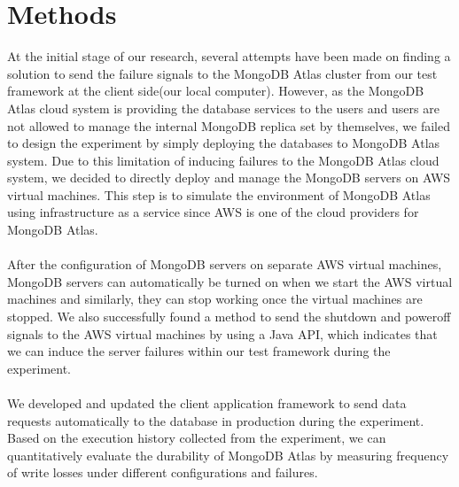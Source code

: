 \documentclass[12pt]{article}
\begin{document}
\section{Methods}
At the initial stage of our research, several attempts have been made on finding a solution to send the failure signals to the MongoDB Atlas cluster from our test framework at the client side(our local computer). However, as the MongoDB Atlas cloud system is providing the database services to the users and users are not allowed to manage the internal MongoDB replica set by themselves, we failed to design the experiment by simply deploying the databases to MongoDB Atlas system. Due to this limitation of inducing failures to the MongoDB Atlas cloud system, we decided to directly deploy and manage the MongoDB servers on AWS virtual machines. This step is to simulate the environment of MongoDB Atlas using infrastructure as a service since AWS is one of the cloud providers for MongoDB Atlas.\\
\\
After the configuration of MongoDB servers on separate AWS virtual machines, MongoDB servers can automatically be turned on when we start the AWS virtual machines and similarly, they can stop working once the virtual machines are stopped. We also successfully found a method to send the shutdown and poweroff signals to the AWS virtual machines by using a Java API, which indicates that we can induce the server failures within our test framework during the experiment.\\
\\
We developed and updated the client application framework to send data requests automatically to the database in production during the experiment. Based on the execution history collected from the experiment, we can quantitatively evaluate the durability of MongoDB Atlas by measuring frequency of write losses under different configurations and failures.\\
\end{document}
